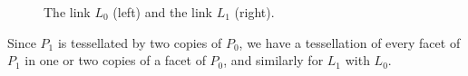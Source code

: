 \documentclass{amsart}
\theoremstyle{definition}
\theoremstyle{remark}
\begin{document}
\begin{figure}

    \caption{The link $L_0$ (left) and the link $L_1$ (right).}\label{f1}
\end{figure}

Since $P_1$ is tessellated by two copies of $P_0$, we have a tessellation of every facet of $P_1$ in one or two copies of a facet of $P_0$, and similarly for $L_1$ with $L_0$.
\end{document}
